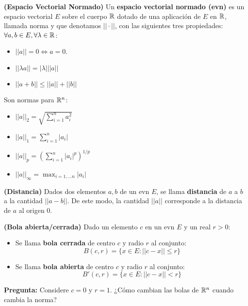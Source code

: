 \begin{definicion}
	\textbf{(Espacio Vectorial Normado)}
	Un \textbf{espacio vectorial normado (evn)} es un espacio vectorial $E$ sobre el cuerpo $\mathbb{R}$ dotado de una aplicación de $E$ en $\mathbb{R}$, llamada norma y que denotamos $|| \cdot ||$, con las siguientes tres propiedades: $\forall a,b \in E, \forall \lambda \in \mathbb{R}$: 
	\begin{itemize}
		\item $|| a || = 0 \iff a = 0$. 
		\item $|| \lambda a || = | \lambda | || a ||$
		\item $|| a + b || \leq || a || + || b ||$
	\end{itemize} 
\end{definicion}
\begin{ejemplo}
	Son normas para $\mathbb{R}^n$: 
	\begin{itemize}
		\item  $||a||_2 = \sqrt{\sum_{i=1}^{n} a_i^2}$
		\item $||a||_1 = \sum_{i=1}^n |a_i|$ 
		\item $||a||_p = \left(\sum_{i=1}^n |a_i|^p \right)^{1/p}$
		\item $||a||_\infty = \max_{i = 1, ... n} | a_i |$
	\end{itemize}
\end{ejemplo}

\begin{definicion}
	\textbf{(Distancia)}
	Dados dos elementos $a, b$ de un evn $E$, se llama \textbf{distancia} de $a$ a $b$ a la cantidad $||a - b ||$. De este modo, la cantidad $||a||$ corresponde a la distancia de $a$ al origen $0$. 
\end{definicion}

\begin{definicion}
	\textbf{(Bola abierta/cerrada)}
	Dado un elemento $c$ en un evn $E$ y un real $r > 0$: 
	\begin{itemize}
		\item Se llama \textbf{bola cerrada} de centro $c$ y radio $r$ al conjunto: 
		$$ B(c, r ) = \{ x \in E : || c - x || \leq r \} $$ 
		\item Se llama \textbf{bola abierta} de centro $c$ y radio $r$ al conjunto: 
		$$ B'(c,r) = \{ x \in E : || c - x || < r \} $$ 
	\end{itemize}	
\end{definicion}

\begin{nota}
	\textbf{Pregunta:} Considere $c = 0$ y $r = 1$. ¿Cómo cambian las bolas de $\mathbb{R}^n$ cuando cambia la norma? 
\end{nota}

